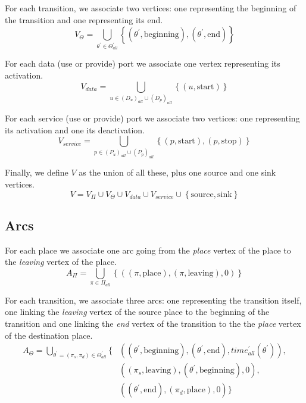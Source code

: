 For each transition, we associate two vertices: one representing the
beginning of the transition and one representing its end. 
\[
V_{\Theta}=\bigcup_{\theta^{\prime}\in\Theta_{all}^{\prime}}\left\{ \left(\theta^{\prime},\text{beginning}\right),\left(\theta^{\prime},\text{end}\right)\right\} 
\]

For each data (use or provide) port we associate one vertex representing
its activation. 
\[
V_{data}=\bigcup_{u\in\left(D_{u}\right)_{all}\cup\left(D_{p}\right)_{all}}\left\{ \left(u,\text{start}\right)\right\} 
\]

For each service (use or provide) port we associate two vertices:
one representing its activation and one its deactivation. 
\[
V_{service}=\bigcup_{p\in\left(P_{u}\right)_{all}\cup\left(P_{p}\right)_{all}}\left\{ \left(p,\text{start}\right),\left(p,\text{stop}\right)\right\} 
\]

Finally, we define $V$ as the union of all these, plus one source
and one sink vertices. 
\[
V=V_{\Pi}\cup V_{\Theta}\cup V_{data}\cup V_{service}\cup\left\{ \text{source},\text{sink}\right\} 
\]


\subsection{Arcs}

For each place we associate one arc going from the \emph{place} vertex of
the place to the \emph{leaving} vertex of the place.
\[
A_{\Pi}=\bigcup_{\pi\in\Pi_{all}}\left\{ \left(\left(\pi,\text{place}\right),\left(\pi,\text{leaving}\right),0\right)\right\} 
\]

For each transition, we associate three arcs: one representing the
transition itself, one linking the \emph{leaving} vertex of the source
place to the beginning of the transition and one linking the \emph{end}
vertex of the transition to the the \emph{place} vertex of the destination
place. 
\begin{align*}
A_{\Theta}=\bigcup_{\theta^{\prime}=\left(\pi_{s},\pi_{d}\right)\in\Theta_{all}^{\prime}}\{ & \left(\left(\theta^{\prime},\text{beginning}\right),\left(\theta^{\prime},\text{end}\right),time_{all}^{\prime}\left(\theta^{\prime}\right)\right),\\
 & \left(\left(\pi_{s},\text{leaving}\right),\left(\theta^{\prime},\text{beginning}\right),0\right),\\
 & \left(\left(\theta^{\prime},\text{end}\right),\left(\pi_{d},\text{place}\right),0\right)\}
\end{align*}

